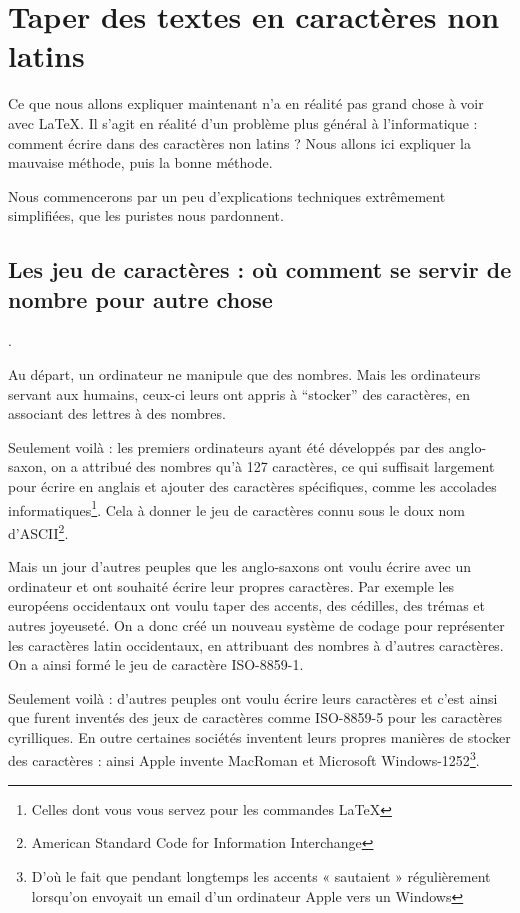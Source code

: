 \section{Taper des textes en caractères non latins}\label{utf8}

Ce que nous allons expliquer maintenant n'a en réalité pas grand chose à voir avec \LaTeX. Il s'agit en réalité d'un problème plus général à l'informatique : comment écrire dans des caractères non latins ? Nous allons ici expliquer la mauvaise méthode, puis la bonne méthode.

Nous commencerons par un peu d'explications techniques extrêmement simplifiées, que les puristes nous pardonnent.

\subsection{Les jeu de caractères : où comment se servir de nombre pour autre chose}.

Au départ, un ordinateur ne manipule que des nombres. Mais les ordinateurs servant aux humains, ceux-ci leurs ont appris à \enquote{stocker} des caractères, en associant des lettres à des nombres.

Seulement voilà : les premiers ordinateurs ayant été développés par des anglo-saxon, on a  attribué des nombres qu'à  127 caractères, ce qui suffisait largement pour écrire en anglais et ajouter des caractères spécifiques, comme les accolades informatiques\footnote{Celles dont vous vous servez pour les commandes \LaTeX}. Cela à donner le jeu de caractères connu sous le doux nom d'ASCII\footnote{\textenglish{American Standard Code for Information Interchange}}.

Mais un jour d'autres peuples que les anglo-saxons ont voulu écrire avec un ordinateur et ont souhaité écrire leur propres caractères. Par exemple les européens occidentaux ont voulu taper des accents, des cédilles, des trémas et autres joyeuseté. On a donc créé un nouveau système de codage pour représenter les caractères latin occidentaux, en attribuant des nombres à d'autres caractères. On a ainsi formé le jeu de caractère  ISO-8859-1. 

Seulement voilà : d'autres peuples ont voulu écrire leurs caractères et c'est ainsi que furent inventés des jeux de caractères comme ISO-8859-5 pour les caractères cyrilliques. En outre certaines sociétés inventent leurs propres manières de stocker des caractères :  ainsi Apple invente MacRoman et Microsoft Windows-1252\footnote{D'où le fait que pendant longtemps les accents « sautaient » régulièrement lorsqu'on envoyait un email d'un ordinateur Apple vers un Windows}. 

